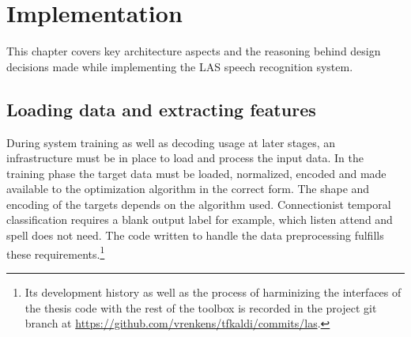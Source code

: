 \chapter{Implementation}
This chapter covers key architecture aspects and the reasoning behind design decisions made while implementing the LAS speech recognition system. 

\section{Loading data and extracting features}
During system training as well as decoding usage at later stages, an infrastructure must be in place to load and process the input data. In the training phase the target data must be loaded, normalized, encoded and made available to the optimization algorithm in the correct form. The shape and encoding of the targets depends on the algorithm used. Connectionist temporal classification requires a blank output label for example, which listen attend and spell does not need.
The code written to handle the data preprocessing fulfills these requirements.\footnote{Its development history as well as the process of harminizing the interfaces of the thesis code with the rest of the toolbox is recorded in the project git branch at \url{https://github.com/vrenkens/tfkaldi/commits/las}.}

